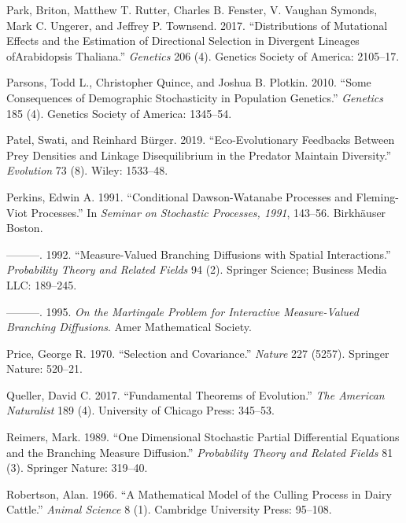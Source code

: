 \documentclass[]{article}
\begin{document}
\leavevmode\hypertarget{ref-Park2017}{}%
Park, Briton, Matthew T. Rutter, Charles B. Fenster, V. Vaughan Symonds,
Mark C. Ungerer, and Jeffrey P. Townsend. 2017. ``Distributions of
Mutational Effects and the Estimation of Directional Selection in
Divergent Lineages ofArabidopsis Thaliana.'' \emph{Genetics} 206 (4).
Genetics Society of America: 2105--17.

\leavevmode\hypertarget{ref-Parsons2010}{}%
Parsons, Todd L., Christopher Quince, and Joshua B. Plotkin. 2010.
``Some Consequences of Demographic Stochasticity in Population
Genetics.'' \emph{Genetics} 185 (4). Genetics Society of America:
1345--54.

\leavevmode\hypertarget{ref-Patel2019}{}%
Patel, Swati, and Reinhard Bürger. 2019. ``Eco-Evolutionary Feedbacks
Between Prey Densities and Linkage Disequilibrium in the Predator
Maintain Diversity.'' \emph{Evolution} 73 (8). Wiley: 1533--48.

\leavevmode\hypertarget{ref-Perkins1991}{}%
Perkins, Edwin A. 1991. ``Conditional Dawson-Watanabe Processes and
Fleming-Viot Processes.'' In \emph{Seminar on Stochastic Processes,
1991}, 143--56. Birkhäuser Boston.

\leavevmode\hypertarget{ref-Perkins1992}{}%
---------. 1992. ``Measure-Valued Branching Diffusions with Spatial
Interactions.'' \emph{Probability Theory and Related Fields} 94 (2).
Springer Science; Business Media LLC: 189--245.

\leavevmode\hypertarget{ref-edwinarendperkins1995}{}%
---------. 1995. \emph{On the Martingale Problem for Interactive
Measure-Valued Branching Diffusions}. Amer Mathematical Society.

\leavevmode\hypertarget{ref-PRICE1970}{}%
Price, George R. 1970. ``Selection and Covariance.'' \emph{Nature} 227
(5257). Springer Nature: 520--21.

\leavevmode\hypertarget{ref-Queller2017}{}%
Queller, David C. 2017. ``Fundamental Theorems of Evolution.'' \emph{The
American Naturalist} 189 (4). University of Chicago Press: 345--53.

\leavevmode\hypertarget{ref-Reimers1989}{}%
Reimers, Mark. 1989. ``One Dimensional Stochastic Partial Differential
Equations and the Branching Measure Diffusion.'' \emph{Probability
Theory and Related Fields} 81 (3). Springer Nature: 319--40.

\leavevmode\hypertarget{ref-Robertson1966}{}%
Robertson, Alan. 1966. ``A Mathematical Model of the Culling Process in
Dairy Cattle.'' \emph{Animal Science} 8 (1). Cambridge University Press:
95--108.
\end{document}
